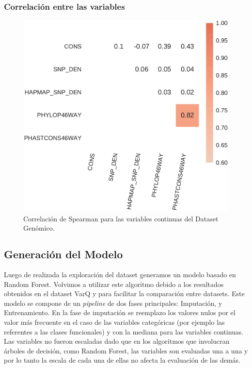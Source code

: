 \subsubsection{Correlación entre las variables}

\begin{figure}[H]
    \centering
    \includegraphics[scale=0.6]{documents/latex/figures/3/genomic/genomic_corr.pdf}
    \caption{Correlación de Spearman para las variables continuas del Dataset Genómico.}
    \label{fig:corrplot_genomic}
\end{figure}

\subsection{Generación del Modelo}

Luego de realizada la exploración del dataset generamos un modelo basado en Random Forest. Volvimos a utilizar este algoritmo debido a los resultados obtenidos en el dataset VarQ y para facilitar la comparación entre datasets. Este modelo se compone de un \textit{pipeline} de dos fases principales: Imputación, y Entrenamiento. En la fase de imputación se reemplazo los valores nulos por el valor más frecuente en el caso de las variables categóricas (por ejemplo las referentes a las clases funcionales) y con la mediana para las variables continuas. Las variables no fueron escaladas dado que en los algoritmos que involucran árboles de decisión, como Random Forest, las variables son evaluadas una a una y por lo tanto la escala de cada una de ellas no afecta la evaluación de las demás.

